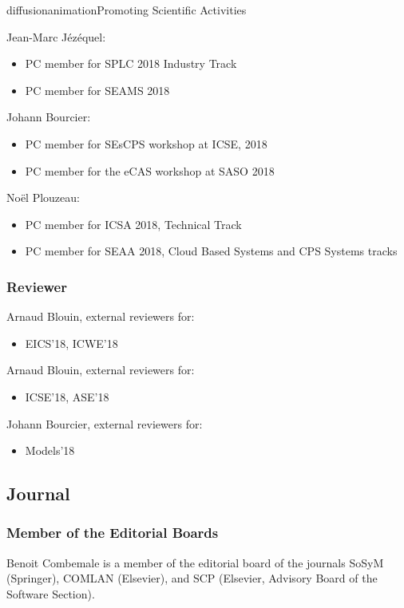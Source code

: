 \documentclass{ra2018}
\begin{document}
\begin{module}{diffusion}{animation}{Promoting Scientific Activities}
    
Jean-Marc J\'ez\'equel:
    \begin{itemize}
    	\item PC member for SPLC 2018 Industry Track
    	\item PC member for SEAMS 2018
    \end{itemize}

Johann Bourcier:
\begin{itemize}
	\item PC member for SEsCPS workshop at ICSE, 2018
	\item PC member for the eCAS workshop at SASO 2018
\end{itemize}
	
	No\"el Plouzeau: 
\begin{itemize}
	\item PC member for ICSA 2018, Technical Track
	\item PC member for SEAA 2018, Cloud Based Systems and CPS Systems tracks
\end{itemize}
    \subsubsection{Reviewer}

 Arnaud Blouin, external reviewers for:
\begin{itemize}
    \item EICS'18, ICWE'18
\end{itemize}    

Arnaud Blouin, external reviewers for:
  \begin{itemize}
   	\item ICSE'18, ASE'18
  \end{itemize}   

Johann Bourcier, external reviewers for:
\begin{itemize}
	\item Models'18
\end{itemize}   

\subsection{Journal}
    \subsubsection{Member of the Editorial Boards}

Benoit Combemale is a member of the editorial board of the journals SoSyM (Springer), COMLAN (Elsevier), and SCP (Elsevier, Advisory Board of the Software Section).    
    

\end{module}
\end{document}
